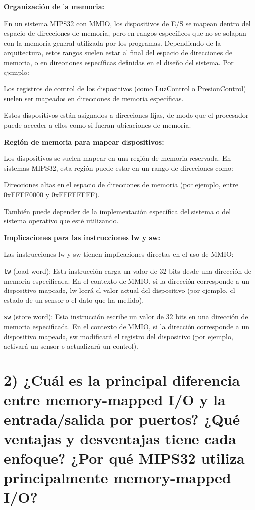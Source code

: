 \documentclass[12pt]{article}
\begin{document}
\textbf{Organización de la memoria:}

En un sistema MIPS32 con MMIO, los dispositivos de E/S se mapean dentro del espacio de direcciones de memoria, pero en rangos específicos que no se solapan con la memoria general utilizada por los programas. Dependiendo de la arquitectura, estos rangos suelen estar al final del espacio de direcciones de memoria, o en direcciones específicas definidas en el diseño del sistema. Por ejemplo:

Los registros de control de los dispositivos (como LuzControl o PresionControl) suelen ser mapeados en direcciones de memoria específicas.

Estos dispositivos están asignados a direcciones fijas, de modo que el procesador puede acceder a ellos como si fueran ubicaciones de memoria.

\textbf{Región de memoria para mapear dispositivos:}

Los dispositivos se suelen mapear en una región de memoria reservada. En sistemas MIPS32, esta región puede estar en un rango de direcciones como:

Direcciones altas en el espacio de direcciones de memoria (por ejemplo, entre 0xFFFF0000 y 0xFFFFFFFF).

También puede depender de la implementación específica del sistema o del sistema operativo que esté utilizando.

\textbf{Implicaciones para las instrucciones lw y sw:}

Las instrucciones lw y sw tienen implicaciones directas en el uso de MMIO:

\texttt{lw} (load word): Esta instrucción carga un valor de 32 bits desde una dirección de memoria especificada. En el contexto de MMIO, si la dirección corresponde a un dispositivo mapeado, lw leerá el valor actual del dispositivo (por ejemplo, el estado de un sensor o el dato que ha medido).

\texttt{sw} (store word): Esta instrucción escribe un valor de 32 bits en una dirección de memoria especificada. En el contexto de MMIO, si la dirección corresponde a un dispositivo mapeado, sw modificará el registro del dispositivo (por ejemplo, activará un sensor o actualizará un control).

\vspace{1cm}
\vspace{1cm}

\section*{2) ¿Cuál es la principal diferencia entre memory-mapped I/O y la entrada/salida por puertos? ¿Qué ventajas y desventajas tiene cada enfoque? ¿Por qué MIPS32 utiliza principalmente memory-mapped I/O?}
\end{document}
